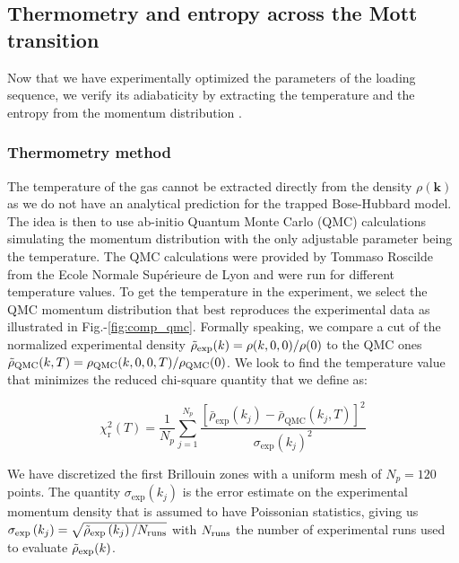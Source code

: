 \subsection{Thermometry and entropy across the Mott transition}

Now that we have experimentally optimized the parameters of the loading sequence, we verify its adiabaticity by extracting the temperature and the entropy from the momentum distribution \cite{carcy2021}.

\subsubsection{Thermometry method}

The temperature of the gas cannot be extracted directly from the density $\rho(\bm{k})$ as we do not have an analytical prediction for the trapped Bose-Hubbard model. The idea is then to use ab-initio Quantum Monte Carlo (QMC) calculations simulating the momentum distribution with the only adjustable parameter being the temperature. The QMC calculations were provided by Tommaso Roscilde from the Ecole Normale Supérieure de Lyon and were run for different temperature values. To get the temperature in the experiment, we select the QMC momentum distribution that best reproduces the experimental data  as illustrated in Fig.-\ref{fig:comp_qmc}. Formally speaking, we compare a cut of the normalized experimental density $\tilde{\rho}_{\rm{exp}}(k)=\rho(k,0,0)/\rho(0)$ to the QMC ones $\tilde{\rho}_{\rm{QMC}}(k,T)=\rho_{\rm{QMC}}(k,0,0,T)/\rho_{\rm{QMC}}(0)$. We look to find the temperature value that minimizes the reduced chi-square quantity that we define as:

\begin{equation}
    \chi_{\mathrm{r}}^{2}(T)=\frac{1}{N_{p}} \sum_{j=1}^{N_{p}} \frac{\left[\bar{\rho}_{\mathrm{exp}}\left(k_{j}\right)-\bar{\rho}_{\mathrm{QMC}}\left(k_{j}, T\right)\right]^{2}}{\sigma_{\exp }\left(k_{j}\right)^{2}}
\end{equation}

\noindent We have discretized the first Brillouin zones with a uniform mesh of $N_p=120$ points. The quantity $\sigma_{\exp }\left(k_{j}\right)$ is the error estimate on the experimental momentum density that is assumed to have Poissonian statistics, giving us $\sigma_{\exp }\left(k_{j}\right)=\sqrt{\tilde{\rho}_{\exp }\left(k_{j}\right) / N_{\rm{runs}}}$ with $N_{\rm{runs}}$ the number of experimental runs used to evaluate $\tilde{\rho}_{\rm{exp}}(k)$.


